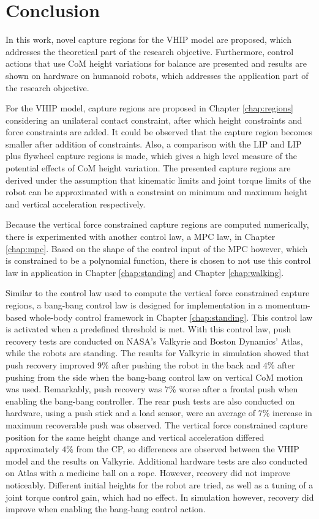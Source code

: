 %
\chapter{Conclusion}\label{chap:conclusion}
In this work, novel capture regions for the \ac{VHIP} model are proposed, which addresses the theoretical part of the research objective. Furthermore, control actions that use \ac{CoM} height variations for balance are presented and results are shown on hardware on humanoid robots, which addresses the application part of the research objective. 

For the \ac{VHIP} model, capture regions are proposed in Chapter \ref{chap:regions} considering an unilateral contact constraint, after which height constraints and force constraints are added. It could be observed that the capture region becomes smaller after addition of constraints. Also, a comparison with the \ac{LIP} and \ac{LIP} plus flywheel capture regions is made, which gives a high level measure of the potential effects of \ac{CoM} height variation. The presented capture regions are derived under the assumption that kinematic limits and joint torque limits of the robot can be approximated with a constraint on minimum and maximum height and vertical acceleration respectively. 

Because the vertical force constrained capture regions are computed numerically, there is experimented with another control law, a \ac{MPC} law, in Chapter \ref{chap:mpc}. Based on the shape of the control input of the \ac{MPC} however, which is constrained to be a polynomial function, there is chosen to not use this control law in application in Chapter \ref{chap:standing} and Chapter \ref{chap:walking}.

Similar to the control law used to compute the vertical force constrained capture regions, a bang-bang control law is designed for implementation in a momentum-based whole-body control framework in Chapter \ref{chap:standing}. This control law is activated when a predefined threshold is met. With this control law, push recovery tests are conducted on NASA's Valkyrie and Boston Dynamics' Atlas, while the robots are standing. The results for Valkyrie in simulation showed that push recovery improved $9$\% after pushing the robot in the back and $4$\% after pushing from the side when the bang-bang control law on vertical \ac{CoM} motion was used. Remarkably, push recovery was $7$\% worse after a frontal push when enabling the bang-bang controller. The rear push tests are also conducted on hardware, using a push stick and a load sensor, were an average of $7$\% increase in maximum recoverable push was observed. The vertical force constrained capture position for the same height change and vertical acceleration differed approximately $4$\% from the \ac{CP}, so differences are observed between the \ac{VHIP} model and the results on Valkyrie. Additional hardware tests are also conducted on Atlas with a medicine ball on a rope. However, recovery did not improve noticeably. Different initial heights for the robot are tried, as well as a tuning of a joint torque control gain, which had no effect. In simulation however, recovery did improve when enabling the bang-bang control action.

